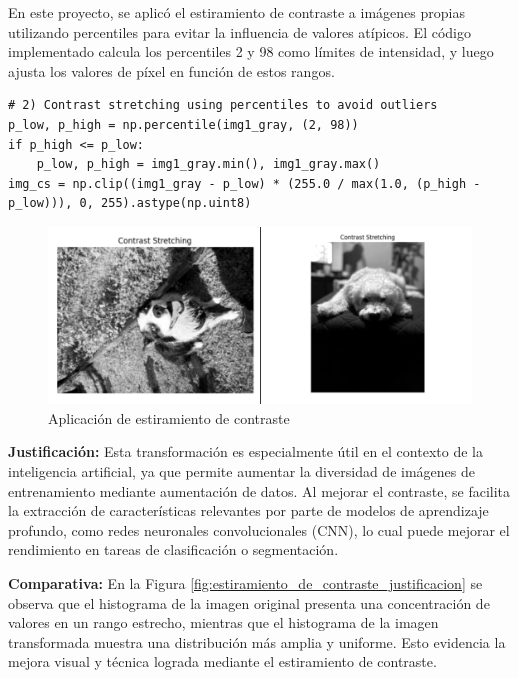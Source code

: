 \documentclass[12pt,letterpaper]{article}
\begin{document}
En este proyecto, se aplicó el estiramiento de contraste a imágenes propias utilizando percentiles para evitar la influencia de valores atípicos. El código implementado calcula los percentiles 2 y 98 como límites de intensidad, y luego ajusta los valores de píxel en función de estos rangos.

\begin{verbatim}
# 2) Contrast stretching using percentiles to avoid outliers
p_low, p_high = np.percentile(img1_gray, (2, 98))
if p_high <= p_low:
    p_low, p_high = img1_gray.min(), img1_gray.max()
img_cs = np.clip((img1_gray - p_low) * (255.0 / max(1.0, (p_high - p_low))), 0, 255).astype(np.uint8)
\end{verbatim}

\begin{figure}[H]
  \centering
  \includegraphics[width=0.8\linewidth]{figuras/estiramiento_de_contraste.png}
  \caption{Aplicación de estiramiento de contraste}
  \label{fig:estiramiento_de_contraste}
\end{figure}

\textbf{Justificación:} Esta transformación es especialmente útil en el contexto de la inteligencia artificial, ya que permite aumentar la diversidad de imágenes de entrenamiento mediante aumentación de datos. Al mejorar el contraste, se facilita la extracción de características relevantes por parte de modelos de aprendizaje profundo, como redes neuronales convolucionales (CNN), lo cual puede mejorar el rendimiento en tareas de clasificación o segmentación.

\textbf{Comparativa:} En la Figura \ref{fig:estiramiento_de_contraste_justificacion} se observa que el histograma de la imagen original presenta una concentración de valores en un rango estrecho, mientras que el histograma de la imagen transformada muestra una distribución más amplia y uniforme. Esto evidencia la mejora visual y técnica lograda mediante el estiramiento de contraste.
\end{document}
